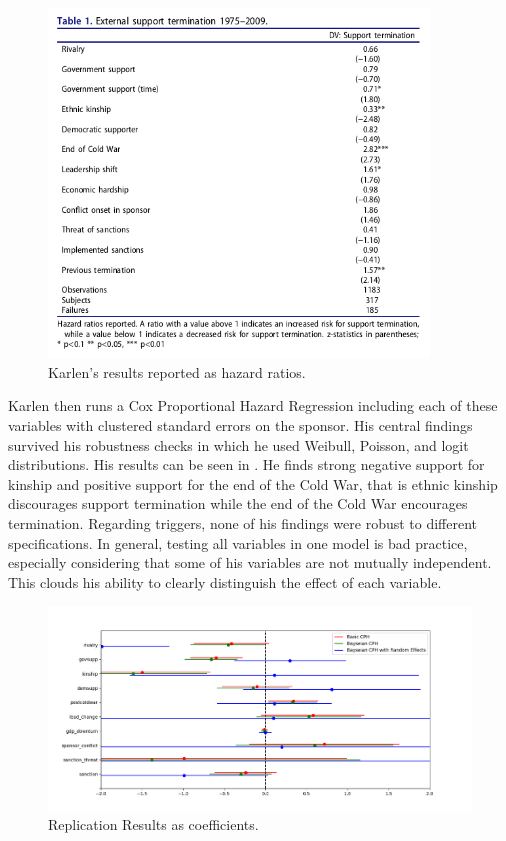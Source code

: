\documentclass[12pt, a4paper]{article}
\begin{document}
\begin{figure}[h]
	\includegraphics[width=0.9\textwidth]{KarlensResults}
	\centering
	\caption{Karlen's results reported as hazard ratios.} 
	\label{Karlen}
\end{figure}
		
Karlen then runs a Cox Proportional Hazard Regression including each of these variables with clustered standard errors on the sponsor. His central findings survived his robustness checks in which he used Weibull, Poisson, and logit distributions. His results can be seen in . He finds strong negative support for kinship and positive support for the end of the Cold War, that is ethnic kinship discourages support termination while the end of the Cold War encourages termination. Regarding triggers, none of his findings were robust to different specifications. In general, testing all variables in one model is bad practice, especially considering that some of his variables are not mutually independent. This clouds his ability to clearly distinguish the effect of each variable. 

\begin{figure}[h] 
	\includegraphics[width=1.3\textwidth, center]{CI_Chart}
	\centering
	\caption{Replication Results as coefficients.}
	\label{Me}
\end{figure}
\end{document}
